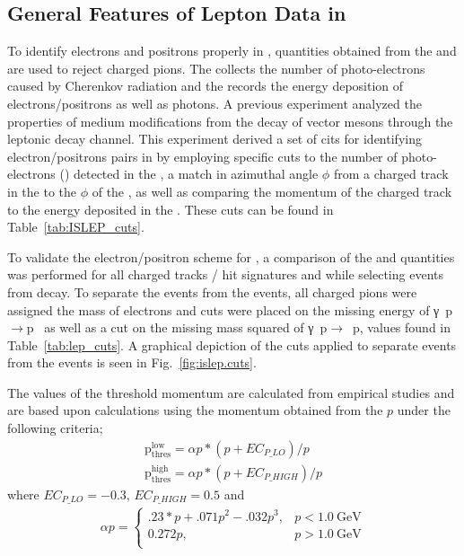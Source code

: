 \subsection{\label{sec:data.lepton}General Features of Lepton Data in }

To identify electrons and positrons properly in , quantities obtained from the  and  are used to reject charged pions. The  collects the number of photo-electrons caused by Cherenkov radiation and the  records the energy deposition of electrons/positrons as well as photons. A previous  experiment  analyzed the properties of medium modifications from the decay of vector mesons through the leptonic decay channel. This experiment derived a set of cits for identifying electron/positrons pairs in  by employing specific cuts to the number of photo-electrons () detected in the , a match in azimuthal angle $\phi$ from a charged track in the  to the $\phi$ of the , as well as comparing the momentum of the charged track to the energy deposited in the . These cuts can be found in Table~\ref{tab:ISLEP_cuts}.  

To validate the  electron/positron  scheme for , a comparison of  the  and  quantities was performed for all charged tracks / hit signatures and while selecting events from \π[0] decay. To separate the \π[0] events from the \π[+]\π[-] events, all charged pions were assigned the mass of electrons and cuts were placed on the missing energy of \mbox{γ p$\rightarrow$p \e[+] \e[-]} as well as a cut on the missing mass squared of \mbox{γ p$\rightarrow$ p}, values found in Table~\ref{tab:lep_cuts}. A graphical depiction of the cuts applied to separate \π[0] events from the \π[+]\π[-] events is seen in Fig.~\ref{fig:islep.cuts}.

The values of the threshold momentum are calculated from empirical studies and are based upon calculations using the momentum obtained from the $p$ under the following criteria;
\begin{align}
\mathrm{p_{thres}^{low}} = \alpha p *(p+EC_{P\_LO})/p \nonumber \\
\mathrm{p_{thres}^{high}} = \alpha p *(p+EC_{P\_HIGH})/p \nonumber
\end{align}
where $EC_{P\_LO} = -0.3$, $EC_{P\_HIGH} = 0.5$ and  
\begin{align}
\alpha p =
\begin{cases}
.23*p + .071p^2 - .032p^3, & p<1.0 \mathrm{~GeV} \\
0.272p, & p>1.0 \mathrm{~GeV} \\
\end{cases}\nonumber
\end{align}


